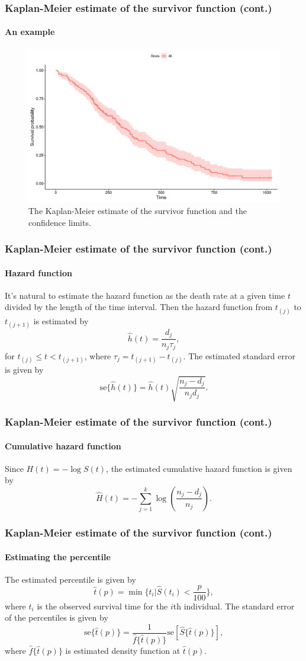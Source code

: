 \documentclass{beamer}
\begin{document}
	\begin{frame}
		\frametitle{Kaplan-Meier estimate of the survivor function (cont.)}
		\framesubtitle{An example}
		
		\begin{figure}[H]
			\centering
			\includegraphics[scale=.33]{km_curve}
			\caption{The Kaplan-Meier estimate of the survivor function and the confidence limits.}
			\label{fig:km}
		\end{figure}
	\end{frame}
	
	\begin{frame}
		\frametitle{Kaplan-Meier estimate of the survivor function (cont.)}
		\framesubtitle{Hazard function}
		It's natural to estimate the hazard function as the death rate at a given time $t$ divided by the length of the time interval. Then the hazard function from $t_{ ( j ) }$ to $t_{ ( j + 1 ) }$ is estimated by 
		\[ \hat{ h }( t ) = \frac{ d_j }{ n_j \tau_j }, \]
		for $t_{ ( j ) } \leq t < t_{ ( j + 1 ) }$, where $\tau_j = t_{ ( j + 1 ) } - t_{ ( j ) }$.
		The estimated standard error is given by
		\[ \text{se}\{ \hat{ h }( t ) \} = \hat{ h }( t )\sqrt{ \frac{ n_j - d_j }{ n_j d_j } }. \]
	\end{frame}
	
	\begin{frame}
		\frametitle{Kaplan-Meier estimate of the survivor function (cont.)}
		\framesubtitle{Cumulative hazard function}
		Since $H( t ) = - \log S( t )$, the estimated cumulative hazard function is given by
		\[ \hat{ H }( t ) = - \sum_{ j = 1 }^{ k } \log \left( \frac{ n_j - d_j }{ n_j } \right). \]
	\end{frame}
	
	\begin{frame}
		\frametitle{Kaplan-Meier estimate of the survivor function (cont.)}
		\framesubtitle{Estimating the percentile}
		The estimated percentile is given by
		\[ \hat{ t }( p ) = \min\{ t_i | \hat{ S }( t_i ) < \frac{ p }{ 100 } \}, \]
		where $t_i$ is the observed survival time for the $i$th individual.
		The standard error of the percentiles is given by
		\[ \text{se}\{ \hat{ t }( p ) \} = \frac{ 1 }{ \hat{ f }\{ \hat{ t }( p ) \} } \text{se}[ \hat{ S }\{\hat{ t }( p )\} ], \]
		where $\hat{ f }\{ \hat{ t }( p ) \}$ is estimated density function at $\hat{ t }( p )$.
	\end{frame}
	
\end{document}
